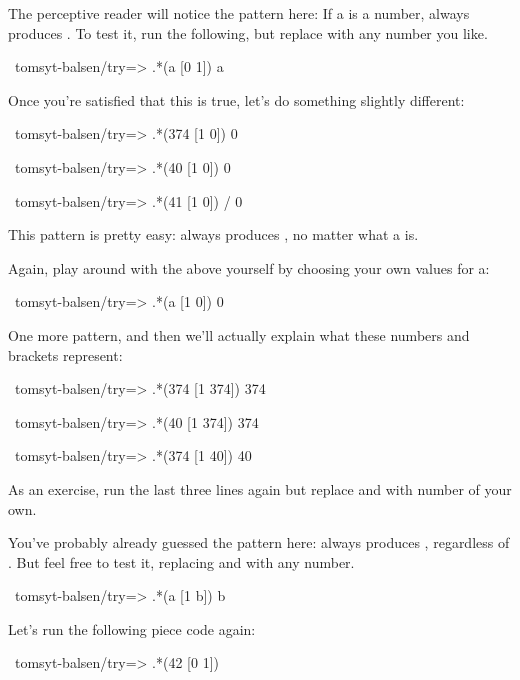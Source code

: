 The perceptive reader will notice the pattern here: If a is a number,  always produces . To test it, run the following, but
replace  with any number you like.

\begin{code}
~tomsyt-balsen/try=> .*(a [0 1]) 
a
\end{code}

Once you're satisfied that this is true, let's do something slightly
different:

\begin{code}
~tomsyt-balsen/try=> .*(374 [1 0]) 
0

~tomsyt-balsen/try=> .*(40 [1 0]) 
0

~tomsyt-balsen/try=> .*(41 [1 0]) /
0
\end{code}

This pattern is pretty easy:  always produces , no matter what a
is.

Again, play around with the above yourself by choosing your own values for a:

\begin{code}
~tomsyt-balsen/try=> .*(a [1 0]) 
0
\end{code}

One more pattern, and then we'll actually explain what these numbers and brackets represent:

\begin{code}
~tomsyt-balsen/try=> .*(374 [1 374]) 
374

~tomsyt-balsen/try=> .*(40 [1 374]) 
374

~tomsyt-balsen/try=> .*(374 [1 40]) 
40
\end{code}

As an exercise, run the last three lines again but replace  and  with
number of your own.

You've probably already guessed the pattern here:  always produces
, regardless of . But feel free to test it, replacing  and  with any number.

\begin{code}
~tomsyt-balsen/try=> .*(a [1 b]) 
b
\end{code}

Let's run the following piece code again:

\begin{code}
~tomsyt-balsen/try=> .*(42 [0 1])
\end{code}


